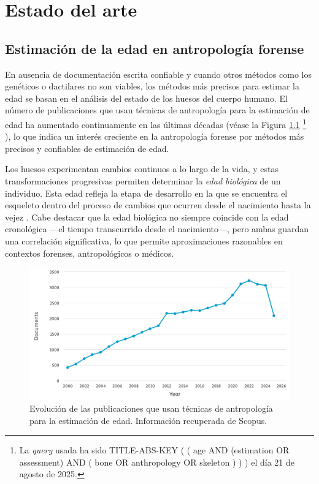 \chapter{Estado del arte}


\section{Estimación de la edad en antropología forense}

En ausencia de documentación escrita confiable y cuando otros métodos como los genéticos o dactilares no son viables, los métodos más precisos para estimar la edad se basan en el análisis del estado de los huesos del cuerpo humano. El número de publicaciones que usan técnicas de antropología para la estimación de edad ha aumentado continuamente en las últimas décadas (véase la Figura \ref{fig:num_papers_1}%
\footnote{
    La \textit{query} usada ha sido
    TITLE-ABS-KEY ( ( age AND (estimation OR assessment) AND ( bone OR anthropology OR skeleton ) ) ) 
    el día 21 de agosto de 2025.
}%
), lo que indica un interés creciente en la antropología forense por métodos más precisos y confiables de estimación de edad.

Los huesos experimentan cambios continuos a lo largo de la vida, y estas transformaciones progresivas permiten determinar la \textit{edad biológica} de un individuo. Esta edad refleja la etapa de desarrollo en la que se encuentra el esqueleto dentro del proceso de cambios que ocurren desde el nacimiento hasta la vejez \cite{byers2023}. Cabe destacar que la edad biológica no siempre coincide con la edad cronológica ---el tiempo transcurrido desde el nacimiento---, pero ambas guardan una correlación significativa, lo que permite aproximaciones razonables en contextos forenses, antropológicos o médicos.

\begin{figure}[h]
    \centering
    \includegraphics[width=\textwidth]{capitulos/cap_03/imagenes/num_papers_1.png}
    \caption[
        Evolución de las publicaciones que usan técnicas de antropología para la estimación de edad. 
    ]{
        Evolución de las publicaciones que usan técnicas de antropología para la estimación de edad. 
        Información recuperada de Scopus.
    }
    \label{fig:num_papers_1}
\end{figure}

